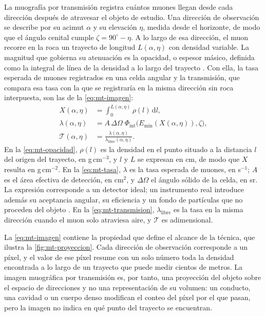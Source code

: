 La muografía por transmisión registra cuántos muones llegan desde cada dirección después de atravesar el objeto de estudio. Una dirección de observación se describe por su acimut $\alpha$ y su elevación $\eta$, medida desde el horizonte, de modo que el ángulo cenital cumple $\zeta=90^\circ-\eta$. A lo largo de esa dirección, el muon recorre en la roca un trayecto de longitud $L(\alpha,\eta)$ con densidad variable. La magnitud que gobierna su atenuación es la opacidad, o espesor másico, definida como la integral de línea de la densidad a lo largo del trayecto \parencite{lesparre2010,tanaka2023muography}. Con ella, la tasa esperada de muones registrados en una celda angular y la transmisión, que compara esa tasa con la que se registraría en la misma dirección sin roca interpuesta, son las de la \cref{eq:mt-imagen}:
\begin{subequations}\label{eq:mt-imagen}
\begin{align}
X(\alpha,\eta)&=\int_{0}^{L(\alpha,\eta)}\rho(l)\,\mathrm dl,\label{eq:mt-opacidad}\\
\lambda(\alpha,\eta)&=A\,\Delta\Omega\;\Phi_{\mathrm{int}}\big(E_{\min}(X(\alpha,\eta)),\zeta\big),\label{eq:mt-tasa}\\
\mathcal T(\alpha,\eta)&=\frac{\lambda(\alpha,\eta)}{\lambda_{\mathrm{libre}}(\alpha,\eta)}.\label{eq:mt-transmision}
\end{align}
\end{subequations}
En la \cref{eq:mt-opacidad}, $\rho(l)$ es la densidad en el punto situado a la distancia $l$ del origen del trayecto, en g\,cm$^{-3}$, y $l$ y $L$ se expresan en cm, de modo que $X$ resulta en g\,cm$^{-2}$. En la \cref{eq:mt-tasa}, $\lambda$ es la tasa esperada de muones, en s$^{-1}$; $A$ es el área efectiva de detección, en cm$^{2}$, y $\Delta\Omega$ el ángulo sólido de la celda, en sr. La expresión corresponde a un detector ideal; un instrumento real introduce además su aceptancia angular, su eficiencia y un fondo de partículas que no proceden del objeto \parencite{lesparre2010}. En la \cref{eq:mt-transmision}, $\lambda_{\mathrm{libre}}$ es la tasa en la misma dirección cuando el muon solo atraviesa aire, y $\mathcal T$ es adimensional.

La \cref{eq:mt-imagen} contiene la propiedad que define el alcance de la técnica, que ilustra la \cref{fig:mt-proyeccion}. Cada dirección de observación corresponde a un píxel, y el valor de ese píxel resume con un solo número toda la densidad encontrada a lo largo de un trayecto que puede medir cientos de metros. La imagen muográfica por transmisión es, por tanto, una proyección del objeto sobre el espacio de direcciones y no una representación de su volumen: un conducto, una cavidad o un cuerpo denso modifican el conteo del píxel por el que pasan, pero la imagen no indica en qué punto del trayecto se encuentran.

